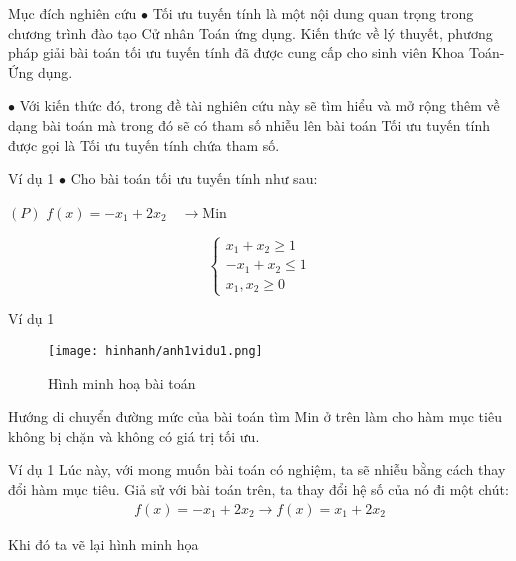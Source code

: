 \documentclass{beamer}
\begin{document}
\begin{frame}{Mục đích nghiên cứu}
    $\bullet$ Tối ưu tuyến tính là một nội dung quan trọng trong chương trình đào tạo Cử nhân Toán ứng dụng. Kiến thức về lý thuyết, phương pháp giải bài toán tối ưu tuyến tính đã được cung cấp cho sinh viên Khoa Toán-Ứng dụng. 
    
    $\bullet$ Với kiến thức đó, trong đề tài nghiên cứu này sẽ tìm hiểu và mở rộng thêm về dạng bài toán mà trong đó sẽ có tham số nhiễu lên bài toán Tối ưu tuyến tính được gọi là Tối ưu tuyến tính chứa tham số. 
\end{frame}
\begin{frame}{Ví dụ 1}
$\bullet$ Cho bài toán tối ưu tuyến tính như sau:

\begin{center}
    $\left(P\right)$ \quad$f(x)=-x_1+2x_2 \quad \longrightarrow $Min
\end{center}
\[\left\{\begin{aligned}
    x_1+x_2 \geq 1\\
    -x_1+x_2\leq 1\\
    x_1,x_2\geq 0
\end{aligned}\right.\]




 
\end{frame}
\begin{frame}{Ví dụ 1}
   \begin{center}
        \begin{figure}[ht]
            \begin{center}

            \texttt{[image: hinhanh/anh1vidu1.png]}  
            
            Hình minh hoạ bài toán
            \end{center}
      \end{figure}
      \end{center}

      Hướng di chuyển đường mức của bài toán tìm Min ở trên làm cho hàm mục tiêu không bị chặn và không có giá trị tối ưu.
\end{frame}


\begin{frame}{Ví dụ 1}
 Lúc này, với mong muốn bài toán có nghiệm, ta sẽ nhiễu  bằng cách thay đổi hàm mục tiêu. Giả sử với bài toán trên, ta thay đổi hệ số của nó đi một chút:
 \[\begin{aligned}
     f(x)=-x_1+2x_2 \longrightarrow f(x)=x_1+2x_2
 \end{aligned}\]
\begin{center}
     Khi đó ta vẽ lại hình minh họa
\end{center}


    

\end{frame}
\end{document}
